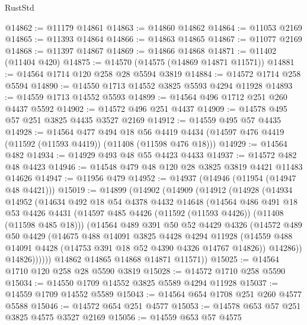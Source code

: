 \begin{lexlean}{RustStd}
\begin{coremodule}
@14862 := @11179 @14861
@14863 := @14860 @14862
@14864 := @11053 @2169
@14865 := @11393 @14864
@14866 := @14863 @14865
@14867 := @11077 @2169
@14868 := @11397 @14867
@14869 := @14866 @14868
@14871 := @11402 (@11404 @420)
@14875 := @14570 (@14575 (@14869 @14871 @11571))
@14881 := @14564 @1714 @120 @258 @28 @5594 @3819
@14884 := @14572 @1714 @258 @5594
@14890 := @14550 @1713 @14552 @3825 @5593 @4294 @11928
@14893 := @14559 @1713 @14552 @5593
@14899 := @14564 @496 @1712 @251 @260 @4437 @5592
@14902 := @14572 @496 @251 @4437
@14909 := @14578 @495 @57 @251 @3825 @4435 @3527 @2169
@14912 := @14559 @495 @57 @4435
@14928 := @14564
    @477
    @494
    @18
    @56
    @4419
    @4434
    (@14597 @476 @4419 (@11592 (@11593 @4419)) (@11408 (@11598 @476 @18)))
@14929 := @14564 @482
@14934 := @14929 @493 @48 @55 @4423 @4433
@14937 := @14572 @482 @48 @4423
@14946 := @14548 @479 @48 @120 @28 @3825 @3819 @4421 @11483 @14626
@14947 := @11956 @479
@14952 := @14937 (@14946 (@11954 (@14947 @48 @4421)))
@15019 := @14899
    (@14902
      (@14909
        (@14912
          (@14928
            (@14934
              @14952
              (@14634
                @492
                @18
                @54
                @4378
                @4432
                @14648
                (@14564
                  @486
                  @491
                  @18
                  @53
                  @4426
                  @4431
                  (@14597 @485 @4426 (@11592 (@11593 @4426)) (@11408 (@11598 @485 @18)))
                  (@14564
                    @489
                    @391
                    @50
                    @52
                    @4429
                    @4326
                    (@14572
                      @489
                      @50
                      @4429
                      (@14675
                        @488
                        @14091
                        @3825
                        @4428
                        @4294
                        @11928
                        (@14559 @488 @14091 @4428 (@14753 @391 @18 @52 @4390 @4326 @14767 @14826))
                        @14286))
                    @14826))))))
        @14862
        @14865
        @14868
        @14871
        @11571))
@15025 := @14564 @1710 @120 @258 @28 @5590 @3819
@15028 := @14572 @1710 @258 @5590
@15034 := @14550 @1709 @14552 @3825 @5589 @4294 @11928
@15037 := @14559 @1709 @14552 @5589
@15043 := @14564 @654 @1708 @251 @260 @4577 @5588
@15046 := @14572 @654 @251 @4577
@15053 := @14578 @653 @57 @251 @3825 @4575 @3527 @2169
@15056 := @14559 @653 @57 @4575

\end{coremodule}
\end{lexlean}
